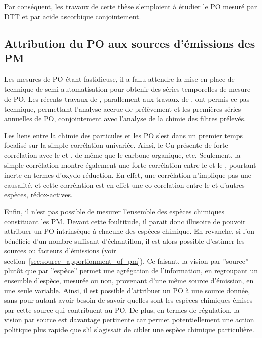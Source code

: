 Par conséquent, les travaux de cette thèse s'emploient à étudier le PO mesuré par DTT et
par acide ascorbique conjointement.

\subsection{Attribution du PO aux sources d'émissions des PM}%
\label{sub:attribution_du_po_aux_sources_d_émissions_des_pm}

Les mesures de PO étant fastidieuse, il a fallu attendre la mise en place de technique
de semi-automatisation pour obtenir des séries temporelles de mesure de PO. Les récents
travaux de \textcite{fangSemiautomated2015}, parallement aux travaux de
\textcite{calasPollution2017}, ont permis ce pas technique, permettant l'analyse accrue de
prélèvement et les premières séries annuelles de PO, conjointement avec l'analyse de la
chimie des filtres prélevés.

Les liens entre la chimie des particules et les PO s'est dans un premier temps focalisé
sur la simple corrélation univariée. Ainsi, le Cu présente de forte corrélation
avec le \PODTT{} et \POAA, de même que le carbone organique, etc. Seulement, la simple
corrélation montre également une forte corrélation entre le \PODTT{} et le ,
pourtant inerte en termes d'oxydo-réduction.
En effet, une corrélation n'implique pas une causalité, et cette corrélation est en effet
une co-corelation entre le  et d'autres espèces, rédox-actives.

Enfin, il n'est pas possible de mesurer l'ensemble des espèces chimiques constituant les
PM. Devant cette foultitude, il parait donc illusoire de pouvoir attribuer un PO
intrinsèque à chacune des espèces chimique.
En revanche, si l'on bénéficie d'un nombre suffisant d'échantillon, il est alors possible
d'estimer les sources ou facteurs d'émissions (voir
section~\ref{sec:source_apportionment_of_pm}). Ce faisant, la vision par ''source'' plutôt
que par ''espèce'' permet une agrégation de l'information, en regroupant un ensemble
d'espèce, mesurée ou non, provenant d'une même source d'émission, en une seule variable.
Ainsi, il est possible d'attribuer un PO à une source donnée, sans pour autant avoir
besoin de savoir quelles sont les espèces chimiques émises par cette source qui
contribuent au PO.
De plus, en termes de régulation, la vision par source est davantage pertinente car permet
potentiellement une action politique plus rapide que s'il s'agissait de cibler une espèce
chimique particulière.


